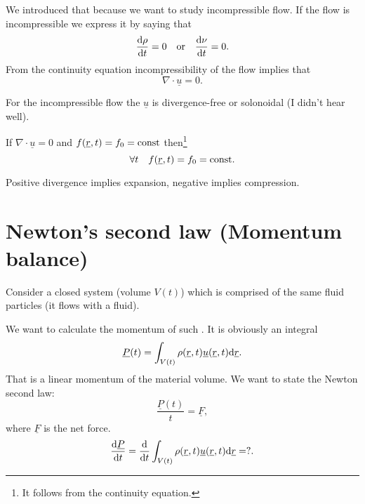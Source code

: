 \documentclass[11pt,oneside]{book}
\renewcommand{\vec}[1]{\underline{#1}}
\theoremstyle{definition} %
\theoremstyle{plain} %
\theoremstyle{remark} %
\theoremstyle{underline}
\begin{document}
  We introduced that because we want to study incompressible flow.
  If the flow is incompressible we express it by saying that
  \begin{displaymath}
    \frac{\mathrm{d} \rho}{\mathrm{d} t} = 0 \quad \textrm{or}\quad  \frac{\mathrm{d} \nu}{\mathrm{d} t} = 0.
  \end{displaymath}
  From the continuity equation incompressibility of the flow implies that
  \begin{displaymath}
    \nabla \cdot \vec u = 0.
  \end{displaymath}
  
  For the incompressible flow the $\vec u$ is divergence-free or solonoidal (\todo I didn't hear well).

  If $\nabla \cdot \vec u = 0$ and $ f(\vec r, t) = f_0 = \tm{const}$ then\footnote{It follows from the continuity equation.}
  \begin{displaymath}
    \forall t \quad f(\vec r, t) = f_0 = \tm{const}.
  \end{displaymath}

  Positive divergence implies expansion, negative implies compression.
  

  \section{Newton's second law (Momentum balance)}
  Consider a closed system (volume $V(t)$) which is comprised of the same fluid particles
  (it flows with a fluid). 

  \begin{figure}[h]
    \centering
  \end{figure}

  We want to calculate the momentum of such .
  It is obviously an integral
  \begin{displaymath}
    \vec P (t) = \int_{V(t)} \rho(\vec r, t) \vec u(\vec r, t) \d \vec r.
  \end{displaymath}
  That is a linear momentum of the material volume.
  We want to state the Newton second law:
  \begin{displaymath}
    \dfrac{\vec P(t)}{t} = \vec F, 
  \end{displaymath}
  where $\vec F$ is the net force.
  \begin{displaymath}
    \dfrac{\vec P}{t} = \dfrac{}{t} \int_{V(t)} \rho(\vec r, t) \vec u (\vec r, t) \d \vec r = ?.
  \end{displaymath}
  
\end{document}
